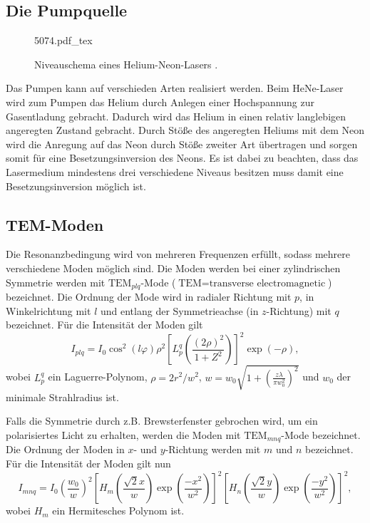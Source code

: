 \subsection{Die Pumpquelle}
\begin{figure}
	\centering
	\def\svgwidth{0.5\linewidth}
	{5074.pdf_tex}
	\caption{Niveauschema eines Helium-Neon-Lasers \cite{VHeNeGoettingen}.}
\end{figure}
Das Pumpen kann auf verschieden Arten realisiert werden. Beim HeNe-Laser wird zum Pumpen das Helium durch Anlegen einer Hochspannung zur Gasentladung gebracht. Dadurch wird das Helium in einen relativ langlebigen angeregten Zustand gebracht. Durch Stöße des angeregten Heliums mit dem Neon wird die Anregung auf das Neon durch Stöße zweiter Art übertragen und sorgen somit für eine Besetzungsinversion des Neons. Es ist dabei zu beachten, dass das Lasermedium mindestens drei verschiedene Niveaus besitzen muss damit eine Besetzungsinversion möglich ist.


\subsection{TEM-Moden}
Die Resonanzbedingung wird von mehreren Frequenzen erfüllt, sodass mehrere verschiedene Moden möglich sind. Die Moden werden bei einer zylindrischen Symmetrie werden mit $\text{TEM}_{plq}$-Mode ($\text{TEM}=\text{transverse electromagnetic}$) bezeichnet. Die Ordnung der Mode wird in radialer Richtung mit $p$, in Winkelrichtung mit $l$ und entlang der Symmetrieachse (in $z$-Richtung) mit $q$ bezeichnet. Für die Intensität der Moden gilt
\begin{equation}
	I_{plq} = I_0 \cos^2 (l \varphi) \rho^2 \left[L_{p}^q\left(\frac{(2 \rho)^2}{1+Z^2} \right)\right] ^2 \exp\left(-\rho \right),
\end{equation}
wobei $L_{p}^q$ ein Laguerre-Polynom, $\rho=2 r^2 / w^2$, $w=w_0 \sqrt{1+\left(\frac{z \lambda}{\pi w_0^2}\right)^2}$ und $w_0$ der minimale Strahlradius ist.

Falls die Symmetrie durch z.B. Brewsterfenster gebrochen wird, um ein polarisiertes Licht zu erhalten, werden die Moden mit  $\text{TEM}_{mnq}$-Mode bezeichnet. Die Ordnung der Moden in $x$- und $y$-Richtung werden mit $m$ und $n$ bezeichnet. Für die Intensität der Moden gilt nun
\begin{equation}
I_{mnq} = I_0 \left(\frac{w_0}{w}\right)^2 \left[H_m\left(\frac{\sqrt{2} x}{w}\right) \exp\left(\frac{-x^2}{w^2}\right) \right]^2 \left[H_n\left(\frac{\sqrt{2} y}{w}\right) \exp\left(\frac{-y^2}{w^2}\right) \right]^2, \label{eq:tem}
\end{equation}
wobei $H_m$ ein Hermitesches Polynom ist.


